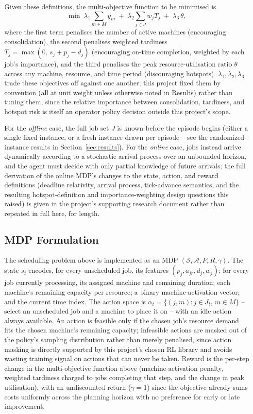 \documentclass[12pt]{article}
\begin{document}
Given these definitions, the multi-objective function to be minimised is
\begin{equation}
      \min \; \lambda_1 \sum_{m \in M} y_m \;+\; \lambda_2 \sum_{j \in J}
  w_j T_j \;+\; \lambda_3\, \theta,
  \end{equation}
where the first term penalises the number of active machines (encouraging consolidation), the second penalises weighted tardiness $T_j = \max(0,\, s_j + p_j - d_j)$ (encouraging on-time completion, weighted by each job's importance), and the third penalises the peak resource-utilisation ratio $\theta$ across any machine, resource, and time period (discouraging hotspots). $\lambda_1,\lambda_2,\lambda_3$ trade these objectives off against one another; this project fixed them by convention (all at unit weight unless otherwise noted in Results) rather than tuning them, since the relative importance between consolidation, tardiness, and hotspot risk is itself an operator policy decision outside this project's scope.

For the \emph{offline} case, the full job set $J$ is known before the episode begins (either a single fixed instance, or a fresh instance drawn per episode -- see the randomized-instance results in Section~\ref{sec:results}). For the \emph{online} case, jobs instead arrive dynamically according to a stochastic arrival process over an unbounded horizon, and the agent must decide with only partial knowledge of future arrivals; the full derivation of the online MDP's changes to the state, action, and reward definitions (deadline relativity, arrival process, tick-advance semantics, and the resulting hotspot-definition and importance-weighting design questions this raised) is given in the project's supporting research document rather than repeated in full here, for length.

\subsection{MDP Formulation}
The scheduling problem above is implemented as an MDP $(\mathcal{S}, \mathcal{A}, P, R, \gamma)$. The state $s_t$ encodes, for every unscheduled job, its features $(p_j, a_{jr}, d_j, w_j)$; for every job currently processing, its assigned machine and remaining duration; each machine's remaining capacity per resource; a binary machine-activation vector; and the current time index. The action space is $\alpha_t = \{(j, m) : j \in J_t,\, m \in M\}$ -- select an unscheduled job and a machine to place it on -- with an idle action always available. An action is feasible only if the chosen job's resource demand fits the chosen machine's remaining capacity; infeasible actions are masked out of the policy's sampling distribution rather than merely penalised, since action masking is directly supported by this project's chosen RL library and avoids wasting training signal on actions that can never be taken. Reward is the per-step change in the multi-objective function above (machine-activation penalty, weighted tardiness charged to jobs completing that step, and the change in peak utilisation), with an undiscounted return ($\gamma = 1$) since the objective already sums costs uniformly across the planning horizon with no preference for early or late improvement.
\end{document}
